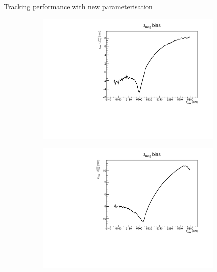 \documentclass[xcolor={dvipsnames}]{beamer}
\begin{document}
\begin{frame}{Tracking performance with new parameterisation}
  \vspace{0.0cm}
  \begin{figure}[htb]
    \centering
    \begin{subfigure}{0.4\textwidth}
      \includegraphics[width=1\textwidth]{Plots/z_mag_position_bias_old_parameterisation.pdf}
    \end{subfigure}%
    \begin{subfigure}{0.4\textwidth}
      \includegraphics[width=1\textwidth]{Plots/z_mag_position_bias_new_parameterisation.pdf}
    \end{subfigure}
  \end{figure}
  \vspace{0.5cm}
  \begin{itemize}

\end{itemize}
\end{frame}
\end{document}
